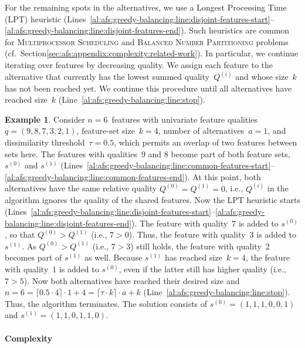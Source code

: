 \documentclass{article}
\theoremstyle{definition}
\newtheorem{example}{Example}
\begin{document}
For the remaining spots in the alternatives, we use a Longest Processing Time (LPT) heuristic (Lines~\ref{al:afs:greedy-balancing:line:disjoint-features-start}--\ref{al:afs:greedy-balancing:line:disjoint-features-end}).
Such heuristics are common for \textsc{Multiprocessor Scheduling} and \textsc{Balanced Number Partitioning} problems~\cite{babel1998thek, chen20023partitioning, lawrinenko2018reduction} (cf.~Section\ref{sec:afs:appendix:complexity:related-work}).
In particular, we continue iterating over features by decreasing quality.
We assign each feature to the alternative that currently has the lowest summed quality~$Q^{(i)}$ and whose size~$k$ has not been reached yet.
We continue this procedure until all alternatives have reached size~$k$ (Line~\ref{al:afs:greedy-balancing:line:stop}).
%
\begin{example}
Consider $n=6$~features with univariate feature qualities $q = (9,8,7,3,2,1)$, feature-set size~$k=4$, number of alternatives~$a=1$, and dissimilarity threshold~$\tau = 0.5$, which permits an overlap of two features between sets here.
The features with qualities~$9$ and $8$ become part of both feature sets, $s^{(0)}$ and $s^{(1)}$ (Lines~\ref{al:afs:greedy-balancing:line:common-features-start}--\ref{al:afs:greedy-balancing:line:common-features-end}).
At this point, both alternatives have the same relative quality $Q^{(0)} = Q^{(1)} = 0$, i.e., $Q^{(i)}$ in the algorithm ignores the quality of the shared features.
Now the LPT heuristic starts (Lines~\ref{al:afs:greedy-balancing:line:disjoint-features-start}--\ref{al:afs:greedy-balancing:line:disjoint-features-end}).
The feature with quality~$7$ is added to $s^{(0)}$, so that $Q^{(0)} > Q^{(1)}$ (i.e., $7 > 0$).
Thus, the feature with quality~3 is added to $s^{(1)}$.
As $Q^{(0)} > Q^{(1)}$ (i.e., $7 > 3$) still holds, the feature with quality~2 becomes part of $s^{(1)}$ as well.
Because $s^{(1)}$ has reached size~$k = 4$, the feature with quality~1 is added to $s^{(0)}$, even if the latter still has higher quality (i.e., $7 > 5$).
Now both alternatives have reached their desired size and $n = 6 = \lceil 0.5 \cdot 4 \rceil \cdot 1 + 4 = \lceil \tau \cdot k \rceil \cdot a + k$ (Line~\ref{al:afs:greedy-balancing:line:stop}).
Thus, the algorithm terminates.
The solution consists of $s^{(0)} = (1,1,1,0,0,1)$ and $s^{(1)} = (1,1,0,1,1,0)$.
\label{ex:afs:greedy-balancing:algorithm}
\end{example}

\paragraph{Complexity}
\end{document}
